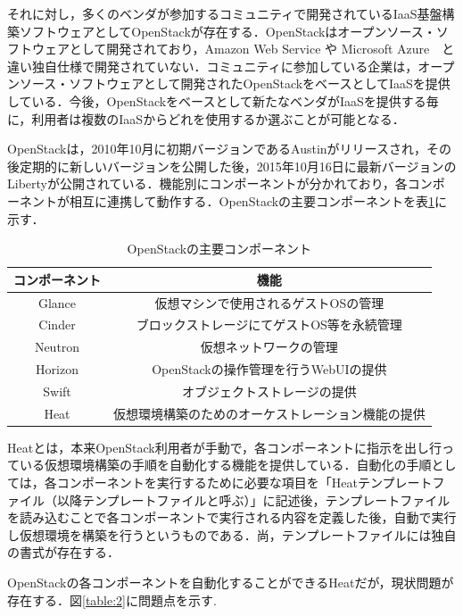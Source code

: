 \documentclass[mingoth]{kut-paper}		%
\begin{document}
	それに対し，多くのベンダが参加するコミュニティで開発されているIaaS基盤構築ソフトウェアとしてOpenStackが存在する．\cite{bib:3}OpenStackはオープンソース・ソフトウェアとして開発されており，Amazon Web Service や Microsoft Azure　と違い独自仕様で開発されていない．コミュニティに参加している企業は，オープンソース・ソフトウェアとして開発されたOpenStackをベースとしてIaaSを提供している．今後，OpenStackをベースとして新たなベンダがIaaSを提供する毎に，利用者は複数のIaaSからどれを使用するか選ぶことが可能となる．
	
	OpenStackは，2010年10月に初期バージョンであるAustinがリリースされ，その後定期的に新しいバージョンを公開した後，2015年10月16日に最新バージョンのLibertyが公開されている．機能別にコンポーネントが分かれており，各コンポーネントが相互に連携して動作する．OpenStackの主要コンポーネントを表\ref{table:1}に示す．
	\begin{table}[H]
		\begin{center}
			\caption{OpenStackの主要コンポーネント}
			\label{table:1}
			\begin{tabular}{|c|c|}\hline
				コンポーネント & 機能\\ \hline \hline
	     		Glance & 仮想マシンで使用されるゲストOSの管理\\ \hline
				Cinder & ブロックストレージにてゲストOS等を永続管理\\ \hline
				Neutron & 仮想ネットワークの管理\\ \hline
				Horizon & OpenStackの操作管理を行うWebUIの提供\\ \hline
				Swift & オブジェクトストレージの提供\\ \hline
				Heat & 仮想環境構築のためのオーケストレーション機能の提供\\ \hline
			\end{tabular}
		\end{center}
	\end{table}
	Heatとは，本来OpenStack利用者が手動で，各コンポーネントに指示を出し行っている仮想環境構築の手順を自動化する機能を提供している．自動化の手順としては，各コンポーネントを実行するために必要な項目を「Heatテンプレートファイル（以降テンプレートファイルと呼ぶ）」に記述後，テンプレートファイルを読み込むことで各コンポーネントで実行される内容を定義した後，自動で実行し仮想環境を構築を行うというものである．尚，テンプレートファイルには独自の書式が存在する．
	
	OpenStackの各コンポーネントを自動化することができるHeatだが，現状問題が存在する．図\ref{table:2}に問題点を示す.
	
\end{document}
